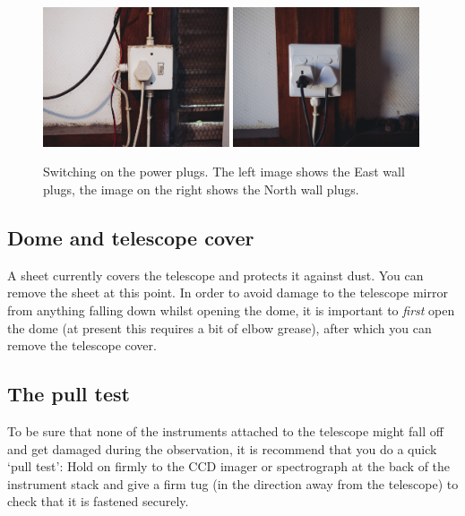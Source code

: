 \documentclass[12pt,twoside,a4paper]{report}
\begin{document}
\begin{figure}[ht]
 \centering
    \includegraphics[width=0.49\textwidth]{documentation_images/plugs_E.jpg}
    \includegraphics[width=0.49\textwidth]{documentation_images/plugsN_2.jpg}
    \caption{\label{fig:plugs}Switching on the power plugs. The left image shows the East wall plugs, the
image on the right shows the North wall plugs.}
\end{figure}

\subsection{Dome and telescope cover}

A sheet currently covers the telescope and protects it against dust. You can remove the sheet at this point.
In order to avoid damage to the telescope mirror from anything falling down whilst opening the dome, 
it is important to \emph{first} open the dome (at present this requires a bit of elbow grease), after which 
you can remove the telescope cover.\\

\subsection{The pull test}
To be sure that none of the instruments attached to the telescope might fall off and get damaged during the observation, it is recommend that you do a quick `pull test': Hold on firmly to the CCD imager or spectrograph at the back of the instrument stack and give a firm tug (in the direction away from the telescope) to check that it is fastened securely.
\end{document}
